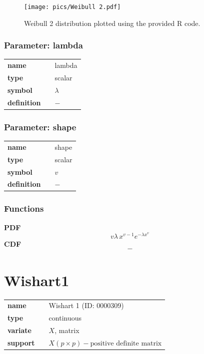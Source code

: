 \documentclass{article}
\begin{document}
\begin{figure}[ht!]
\centering
  \texttt{[image: pics/Weibull 2.pdf]}
 \caption{Weibull 2 distribution plotted using the provided R code.}
 \label{fig:Weibull 2}
\end{figure}

\subsubsection*{Parameter: lambda}

\noindent\begin{tabular}{p{2cm}cl}
\textbf{name} & & lambda \\
\textbf{type} & & scalar \\
\textbf{symbol} & & $\lambda$  \\
\textbf{definition} & & $-$
\end{tabular}
\subsubsection*{Parameter: shape}

\noindent\begin{tabular}{p{2cm}cl}
\textbf{name} & & shape \\
\textbf{type} & & scalar \\
\textbf{symbol} & & $v$  \\
\textbf{definition} & & $-$
\end{tabular}
\subsubsection*{Functions}

\smallskip \noindent \hspace{.2cm} \textbf{PDF} 
\begin{equation*}v\lambda \,x^{v-1} e^{-\lambda x^{v}}\end{equation*}
\smallskip \noindent \hspace{.2cm} \textbf{CDF} 
\begin{equation*}-\end{equation*}
\smallskip\section*{Wishart1} 

  \bigskip 

\begin{tabular}{p{2cm}cl}
\textbf{name} & & Wishart 1 (ID: 0000309)\\ 
 
\textbf{type} & & continuous \\ 

\textbf{variate} & & $X$, matrix \\ 

\textbf{support} & & $X(p \times p) - \text{positive definite matrix}$
\end{tabular}
\end{document}
